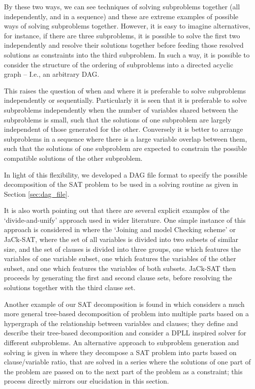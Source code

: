 \documentclass[
10pt, %
a4paper, %
oneside, %
headinclude,footinclude, %
BCOR5mm, %
]{scrartcl}
\begin{document}
By these two ways, we can see techniques of solving subproblems together (all independently, and in a sequence) and these are extreme examples of possible ways of solving subproblems together.
However, it is easy to imagine alternatives, for instance, if there are three subproblems, it is possible to solve the first two independently and resolve their solutions together 
before feeding those resolved solutions as constraints into the third subproblem.
In such a way, it is possible to consider the structure of the ordering of subproblems into a directed acyclic graph -- I.e., an arbitrary DAG.

This raises the question of when and where it is preferable to solve subproblems independently or sequentially.
Particularly it is seen that it is preferable to solve subproblems independently when the number of variables shared between the subproblems is small, such that the solutions of one subproblem are largely independent of those generated for the other.
Conversely it is better to arrange subproblems in a sequence where there is a large variable overlap between them, such that the solutions of one subproblem are expected to constrain the possible compatible solutions of the other subproblem.

In light of this flexibility, we developed a DAG file format to specify the possible decomposition of the SAT problem to be used in a solving routine as given in Section \ref{sec:dag_file}.

It is also worth pointing out that there are several explicit examples of the `divide-and-unify' approach used in wider literature. 
One simple instance of this approach is considered in \cite{DBLP:conf/ppam/SingerM07} where the `Joining and model Checking scheme' or JaCk-SAT, where the set of all variables is divided into two subsets of similar size, and the set of clauses is divided into three groups, one which features the variables of one variable subset, one which features the variables of the other subset, and one which features the variables of both subsets.
JaCk-SAT then proceeds by generating the first and second clause sets, before resolving the solutions together with the third clause set.

Another example of our SAT decomposition is found in \cite{conf/ictai/HabetPT09} which considers a much more general tree-based decomposition of problem into multiple parts based on a hypergraph of the relationship between variables and clauses; they define and describe their tree-based decomposition and consider a DPLL inspired solver for different subproblems.
An alternative approach to subproblem generation and solving is given in \cite{DBLP:journals/endm/AmirM01} where they decompose a SAT problem into parts based on clause/variable ratio, that are solved in a series where the solutions of one part of the problem are passed on to the next part of the problem as a constraint; this process directly mirrors our elucidation in this section.
\end{document}
